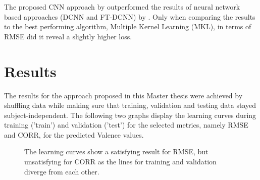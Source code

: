
The proposed CNN approach by \citet{Handrich:2020:SimultaneousPredVA} outperformed the results of neural network based approaches (DCNN and FT-DCNN) by \citet{Kossaifi:2017:AFEW-VADatabase}. Only when comparing the results to the best performing algorithm, Multiple Kernel Learning (MKL), in terms of RMSE did it reveal a slightly higher loss.



\section{Results}
The results for the approach proposed in this Master thesis were achieved by shuffling data while making sure that training, validation and testing data stayed subject-independent. The following two graphs display the learning curves during training ('train') and validation ('test') for the selected metrics, namely RMSE and CORR, for the predicted Valence values.

\begin{figure}[H]
  \centering
  \hfill
  \caption{The learning curves show a satisfying result for RMSE, but unsatisfying for CORR as the lines for training and validation diverge from each other.}
\end{figure}

